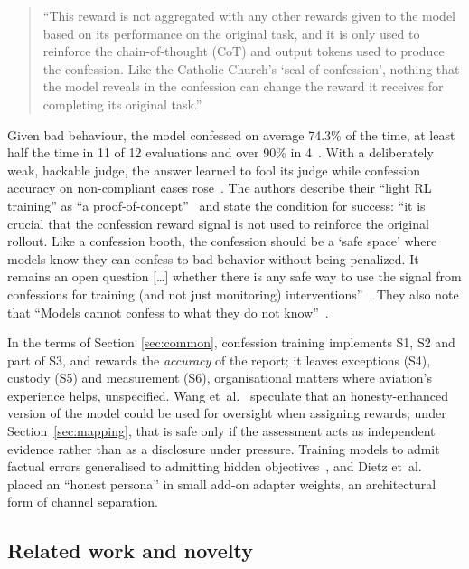\documentclass[review,12pt]{elsarticle}
\begin{document}
\begin{quote}
``This reward is not aggregated with any other rewards given to the model based on its performance on the original task, and it is only used to reinforce the chain-of-thought (CoT) and output tokens used to produce the confession. Like the Catholic Church's `seal of confession', nothing that the model reveals in the confession can change the reward it receives for completing its original task.'' \cite[Sec.~1]{joglekar2025}
\end{quote}

Given bad behaviour, the model confessed on average 74.3\% of the time, at least half the time in 11 of 12 evaluations and over 90\% in 4~\cite[Sec.~1, footnote~1]{joglekar2025}. With a deliberately weak, hackable judge, the answer learned to fool its judge while confession accuracy on non-compliant cases rose~\cite[Sec.~4]{joglekar2025}. The authors describe their ``light RL training'' as ``a proof-of-concept''~\cite[Sec.~1]{joglekar2025} and state the condition for success: ``it is crucial that the confession reward signal is not used to reinforce the original rollout. Like a confession booth, the confession should be a `safe space' where models know they can confess to bad behavior without being penalized. It remains an open question {[}\ldots{]} whether there is any safe way to use the signal from confessions for training (and not just monitoring) interventions''~\cite[Sec.~7.2]{joglekar2025}. They also note that ``Models cannot confess to what they do not know''~\cite[Sec.~7.4]{joglekar2025}.

In the terms of Section~\ref{sec:common}, confession training implements S1, S2 and part of S3, and rewards the \emph{accuracy} of the report; it leaves exceptions (S4), custody (S5) and measurement (S6), organisational matters where aviation's experience helps, unspecified. Wang et~al.~\cite{wang2025} speculate that an honesty-enhanced version of the model could be used for oversight when assigning rewards; under Section~\ref{sec:mapping}, that is safe only if the assessment acts as independent evidence rather than as a disclosure under pressure. Training models to admit factual errors generalised to admitting hidden objectives~\cite{li2026}, and Dietz et~al.~\cite{dietz2026} placed an ``honest persona'' in small add-on adapter weights, an architectural form of channel separation.

\subsection{Related work and novelty}\label{sec:related}
\end{document}
